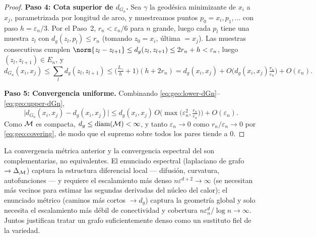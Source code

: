 \begin{proof}
\textbf{Paso 4: Cota superior de $d_{G_n}$.} Sea $\gamma$ la geod\'esica
minimizante de $x_i$ a $x_j$, parametrizada por longitud de arco, y muestreamos
puntos $p_0 = x_i, p_1, \dots$ con paso $h = \varepsilon_n/3$. Por el Paso~2,
$r_n < \varepsilon_n/6$ para $n$ grande, luego cada $p_l$ tiene una muestra $z_l$
con $d_g(z_l, p_l) \le r_n$ (tomando $z_0 = x_i$, \'ultima $= x_j$). Las muestras
consecutivas cumplen
$\norm{z_l - z_{l+1}} \le d_g(z_l, z_{l+1}) \le 2r_n + h < \varepsilon_n$, luego
$(z_l, z_{l+1}) \in E_n$, y
\begin{equation}
\label{eq:geo:upper-dGn}
  d_{G_n}(x_i, x_j) \le \sum_l d_g(z_l, z_{l+1})
    \le \big(\tfrac{L_\gamma}{h} + 1\big)(h + 2r_n)
    = d_g(x_i, x_j) + O\!\Big(d_g(x_i,x_j)\tfrac{r_n}{\varepsilon_n}\Big)
      + O(\varepsilon_n).
\end{equation}

\textbf{Paso 5: Convergencia uniforme.} Combinando
\eqref{eq:geo:lower-dGn}--\eqref{eq:geo:upper-dGn},
\[
  \big| d_{G_n}(x_i,x_j) - d_g(x_i,x_j)\big|
    \le d_g(x_i,x_j)\, O\!\Big(\max\big(\varepsilon_n^2, \tfrac{r_n}{\varepsilon_n}\big)\Big)
      + O(\varepsilon_n).
\]
Como $\mathcal{M}$ es compacta, $d_g \le \operatorname{diam}(\mathcal{M}) < \infty$, y tanto
$\varepsilon_n \to 0$ como $r_n/\varepsilon_n \to 0$ por \eqref{eq:geo:covering},
de modo que el supremo sobre todos los pares tiende a $0$.
\end{proof}

\begin{remark}
\label{rem:geo:two-convergences}
La convergencia m\'etrica anterior y la convergencia espectral del
 son complementarias, no equivalentes. El enunciado espectral
(laplaciano de grafo $\to \Delta_{\mathcal{M}}$) captura la estructura diferencial local
--- difusi\'on, curvatura, autofunciones --- y requiere el escalamiento m\'as
denso $n\varepsilon^{d+2} \to \infty$ (se necesitan m\'as vecinos para estimar
las segundas derivadas del n\'ucleo del calor); el enunciado m\'etrico
(caminos m\'as cortos $\to d_g$) captura la geometr\'ia global y solo necesita el
escalamiento m\'as d\'ebil de conectividad y cobertura
$n\varepsilon_n^d/\log n \to \infty$. Juntos justifican tratar un grafo
suficientemente denso como un sustituto fiel de la variedad.
\end{remark}


